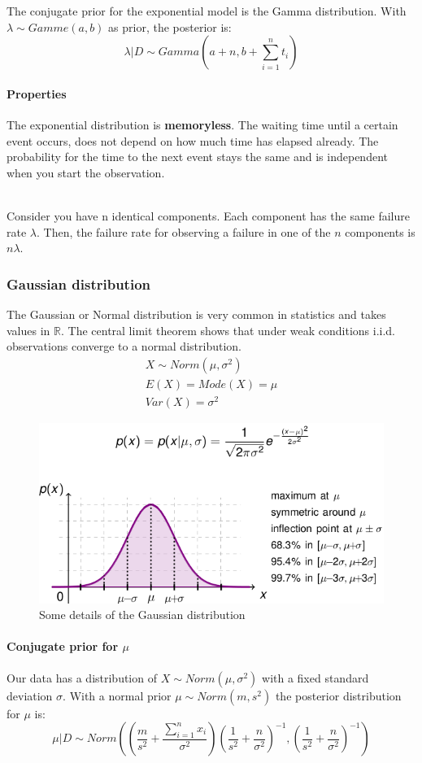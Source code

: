 The conjugate prior for the exponential model is the Gamma distribution. With $\lambda\sim Gamme(a, b)$ as prior, the posterior is:
\begin{equation*}
\lambda|D\sim Gamma(a+n, b+\sum_{i=1}^{n}t_i)
\end{equation*}

\paragraph{Properties}
The exponential distribution is \textbf{memoryless}. The waiting time until a certain event occurs, does not depend on how much time has elapsed already. The probability for the time to the next event stays the same and is independent when you start the observation.

\mbox{}\\
Consider you have n identical components. Each component has the same failure rate $\lambda$. Then, the failure rate for observing a failure in one of the $n$ components is $n\lambda$.

\subsubsection{Gaussian distribution}
The Gaussian or Normal distribution is very common in statistics and takes values in $\mathbb{R}$. The central limit theorem shows that under weak conditions i.i.d. observations converge to a normal distribution.
\begin{gather*}
X\sim Norm(\mu, \sigma^2)\\
E(X) = Mode(X) = \mu\\
Var(X) = \sigma^2
\end{gather*}

\begin{figure}[H]
	\centering
	\includegraphics[width=.7\textwidth]{images/gaussian-details.png}
	\caption{Some details of the Gaussian distribution}
\end{figure}

\paragraph{Conjugate prior for $\mu$}
Our data has a distribution of $X\sim Norm(\mu, \sigma^2)$ with a fixed standard deviation $\sigma$. With a normal prior $\mu\sim Norm(m, s^2)$ the posterior distribution for $\mu$ is:
\begin{equation*}
\mu|D\sim Norm\left((\frac{m}{s^2}+\frac{\sum_{i=1}^{n}x_i}{\sigma^2})(\frac{1}{s^2}+\frac{n}{\sigma^2})^{-1}, (\frac{1}{s^2}+\frac{n}{\sigma^2})^{-1}\right)
\end{equation*}

